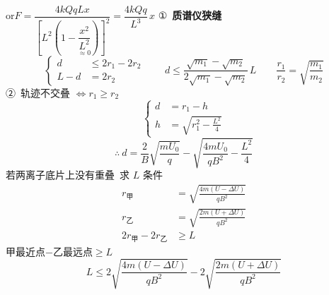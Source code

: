 or\quad $F=\dfrac{4kQqLx}{\left[L^{2}\left(1-\underset{\approx0}{\dfrac{x^{2}}{L^{2}}}\right)\right]^{2}}=\dfrac{4kQq}{L^{3}}\,x$
①\ \textbf{质谱仪狭缝}
\[
\left\{\begin{aligned}
d&\le 2r_{1}-2r_{2}\\
L-d&=2r_{2}
\end{aligned}\right.
\qquad d\le\frac{\sqrt{m_{1}}-\sqrt{m_{2}}}{2\sqrt{m_{1}}-\sqrt{m_{2}}}\,L
\qquad \frac{r_{1}}{r_{2}}=\sqrt{\frac{m_{1}}{m_{2}}}
\]
②\ 轨迹不交叠 $\Leftrightarrow r_{1}\ge r_{2}$
\[
\left\{\begin{aligned}
d&=r_{1}-h\\
h&=\sqrt{r_{1}^{2}-\frac{L^{2}}{4}}
\end{aligned}\right.
\]
\[
\therefore\ d=\frac{2}{B}\sqrt{\frac{mU_{0}}{q}}-\sqrt{\frac{4mU_{0}}{qB^{2}}-\frac{L^{2}}{4}}
\]
若两离子底片上没有重叠\ 求 $L$ 条件
\begin{align*}
r_{\text{甲}}&=\sqrt{\frac{4m(U-\Delta U)}{qB^{2}}}\\
r_{\text{乙}}&=\sqrt{\frac{2m(U+\Delta U)}{qB^{2}}}\\
2r_{\text{甲}}-2r_{\text{乙}}&\ge L
\end{align*}
甲最近点$-$乙最远点$\ge L$
\[
L\le2\sqrt{\frac{4m(U-\Delta U)}{qB^{2}}}-2\sqrt{\frac{2m(U+\Delta U)}{qB^{2}}}
\]
